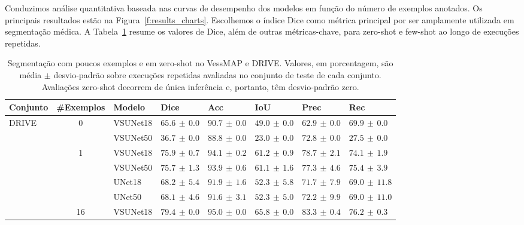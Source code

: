 \documentclass[%
reprint,
nofootinbib,
 amsmath,amssymb,
aps,
floatfix,
superscriptaddress,
showkeys,
longbibliography
]{revtex4-1}
\begin{document}
Conduzimos análise quantitativa baseada nas curvas de desempenho dos modelos em função do número de exemplos anotados. Os principais resultados estão na Figura~\ref{f:results_charts}. Escolhemos o índice Dice como métrica principal por ser amplamente utilizada em segmentação médica. A Tabela~\ref{tab:combined_fewshot_percent} resume os valores de Dice, além de outras métricas-chave, para zero-shot e few-shot ao longo de execuções repetidas.

\begin{table}[t]
    \caption{Segmentação com poucos exemplos e em zero-shot no VessMAP e DRIVE. Valores, em porcentagem, são média $\pm$ desvio-padrão sobre execuções repetidas avaliadas no conjunto de teste de cada conjunto. Avaliações zero-shot decorrem de única inferência e, portanto, têm desvio-padrão zero.}
    \label{tab:combined_fewshot_percent}
    \centering
    \begingroup
    \small
    \setlength{\tabcolsep}{4pt}
    \renewcommand{\arraystretch}{1.15}
    \begin{tabular}{l c l l l l l l}
        \hline
        \textbf{Conjunto} & \textbf{\#Exemplos} & \textbf{Modelo} & \textbf{Dice} & \textbf{Acc} & \textbf{IoU} & \textbf{Prec} & \textbf{Rec} \\
        \hline
        \multirow{10}{*}{DRIVE} & \multirow{2}{*}{0} & VSUNet18 & $\mathbf{65.6} \,\pm\, 0.0$ & $90.7 \,\pm\, 0.0$ & $49.0 \,\pm\, 0.0$ & $62.9 \,\pm\, 0.0$ & $69.9 \,\pm\, 0.0$ \\
         &  & VSUNet50 & $36.7 \,\pm\, 0.0$ & $88.8 \,\pm\, 0.0$ & $23.0 \,\pm\, 0.0$ & $72.8 \,\pm\, 0.0$ & $27.5 \,\pm\, 0.0$ \\
         \cline{2-8}
         & \multirow{4}{*}{1} & VSUNet18 & $\mathbf{75.9} \,\pm\, 0.7$ & $94.1 \,\pm\, 0.2$ & $61.2 \,\pm\, 0.9$ & $78.7 \,\pm\, 2.1$ & $74.1 \,\pm\, 1.9$ \\
         &  & VSUNet50 & $75.7 \,\pm\, 1.3$ & $93.9 \,\pm\, 0.6$ & $61.1 \,\pm\, 1.6$ & $77.3 \,\pm\, 4.6$ & $75.4 \,\pm\, 3.9$ \\
         &  & UNet18 & $68.2 \,\pm\, 5.4$ & $91.9 \,\pm\, 1.6$ & $52.3 \,\pm\, 5.8$ & $71.7 \,\pm\, 7.9$ & $69.0 \,\pm\, 11.8$ \\
         &  & UNet50 & $68.1 \,\pm\, 4.6$ & $91.6 \,\pm\, 3.1$ & $52.3 \,\pm\, 5.0$ & $72.2 \,\pm\, 9.9$ & $69.0 \,\pm\, 11.0$ \\
         \cline{2-8}
         & \multirow{4}{*}{16} & VSUNet18 & $79.4 \,\pm\, 0.0$ & $95.0 \,\pm\, 0.0$ & $65.8 \,\pm\, 0.0$ & $83.3 \,\pm\, 0.4$ & $76.2 \,\pm\, 0.3$ \\

\end{tabular}
\end{table}
\end{document}
